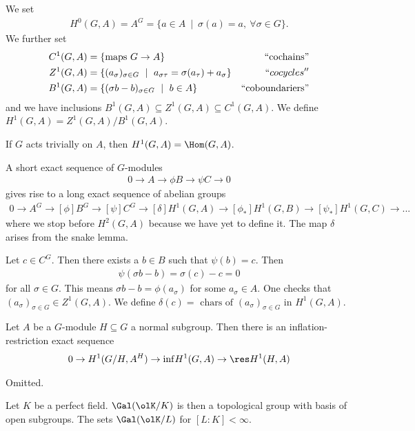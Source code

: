 \begin{defn}\label{defn:basic-homology-defs}
	We set
	\begin{align*}
		H^0(G,A) = A^G = \{a \in A ~\mid~ \sigma(a) = a, ~ \forall \sigma \in G\}.
	\end{align*}
	We further set
	\begin{align*}
		C^1(G,A) &= \{\text{maps } G\to A\} & \text{``cochains''} \\
		Z^1(G,A) &= \{(a_\sigma)_{\sigma \in G} ~ \mid ~ a_{\sigma \tau} = \sigma(a_\tau) + a_\sigma\} & ``cocycles'' \\
		B^1(G,A) &= \{(\sigma b - b)_{\sigma \in G} ~ \mid ~ b \in A\} & \text{``coboundariers''}
	\end{align*}
	and we have inclusions $B^1(G,A) \subseteq Z^1(G,A) \subseteq C^1(G,A)$. We define $H^1(G,A) = Z^1(G,A)/B^1(G,A)$.
\end{defn}
\begin{rmk}
	If $G$ acts trivially on $A$, then $H^1(G,A) = \Hom(G,A)$.
\end{rmk}
\begin{thm}\label{thm:ses-induces-les-on-cohomology}
	A short exact sequence of $G$-modules
	\begin{align*}
		0 \to A \to{\phi} B \to{\psi} C \to 0
	\end{align*}
	gives rise to a long exact sequence of abelian groups
	\begin{align*}
		0 \to A^G \to[\phi] B^G \to[\psi] C^G \to[\delta] H^1(G,A) \to[\phi_*] H^1(G,B) \to[\psi_*] H^1(G,C) \to ...
	\end{align*}
	where we stop before $H^2(G,A)$ because we have yet to define it. The map $\delta$ arises from the snake lemma.
\end{thm}
\begin{defn}\label{defn:delta-in-les-cohomology}
	Let $c \in C^G$. Then there exists a $b \in B$ such that $\psi(b) = c$. Then
	\begin{align*}
		\psi(\sigma b - b) = \sigma(c) - c= 0
	\end{align*}
	for all $\sigma \in G$. This means $\sigma b - b = \phi(a_\sigma)$ for some $a_\sigma \in A$. One checks that $(a_\sigma)_{\sigma \in G} \in Z^1(G,A)$. We define $\delta(c) = \text{ chars of } (a_\sigma)_{\sigma \in G}$ in $H^1(G,A)$.
\end{defn}
\begin{thm}\label{thm:normal-subgroup-exact-sequence}
	Let $A$ be a $G$-module $H \subseteq G$ a normal subgroup. Then there is an inflation-restriction exact sequence
	\begin{align*}
		0 \to H^1(G/H,A^H) \to{\inf} H^1(G,A) \to{\res} H^1(H,A)
	\end{align*}
\end{thm}
\begin{prf}
	Omitted.
\end{prf}
Let $K$ be a perfect field. $\Gal(\olK/K)$ is then a topological group with basis of open subgroups. The sets $\Gal(\olK/L)$ for $[L:K] < \infty$.

